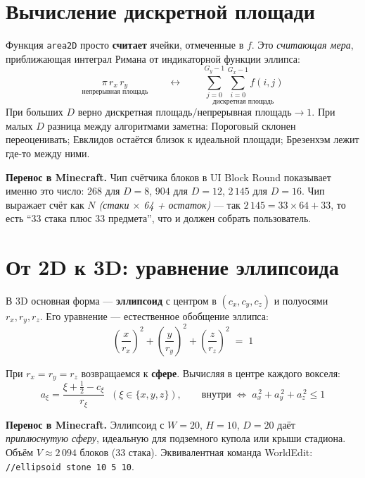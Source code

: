 \documentclass[12pt,a4paper]{scrartcl}
\newcommand{\code}[1]{\texttt{\small #1}}
\newcommand{\acc}[1]{\textcolor{accent}{\textbf{#1}}}
\newcommand{\cmd}[1]{\textcolor{earth}{\texttt{\small #1}}}
\begin{document}
\section{Вычисление дискретной площади}

Функция \code{area2D} просто \acc{считает} ячейки, отмеченные в $f$. Это \emph{считающая мера}, приближающая интеграл Римана от индикаторной функции эллипса:
\[
\underset{\text{непрерывная площадь}}{\pi \, r_x \, r_y}
\qquad\longleftrightarrow\qquad
\underset{\text{дискретная площадь}}{\sum_{j=0}^{G_y-1}\sum_{i=0}^{G_x-1} f(i,j)}
\]
При больших $D$ верно $\text{дискретная площадь} / \text{непрерывная площадь} \to 1$. При малых $D$ разница между алгоритмами заметна: Пороговый склонен переоценивать; Евклидов остаётся близок к идеальной площади; Брезенхэм лежит где-то между ними.

\begin{minec}
\textbf{Перенос в Minecraft.} Чип счётчика блоков в UI Block Round показывает именно это число: $268$ для $D=8$, $904$ для $D=12$, $2\,145$ для $D=16$. Чип выражает счёт как \emph{$N$ (стаки $\times$ 64 + остаток)} — так $2\,145 = 33 \times 64 + 33$, то есть \enquote{$33$ стака плюс $33$ предмета}, что и должен собрать пользователь.
\end{minec}

\section{От 2D к 3D: уравнение эллипсоида}

В 3D основная форма — \acc{эллипсоид} с центром в $(c_x, c_y, c_z)$ и полуосями $r_x, r_y, r_z$. Его уравнение — естественное обобщение эллипса:
\[
\left(\dfrac{x}{r_x}\right)^{\!2} + \left(\dfrac{y}{r_y}\right)^{\!2} + \left(\dfrac{z}{r_z}\right)^{\!2} \;=\; 1
\]

При $r_x = r_y = r_z$ возвращаемся к \acc{сфере}. Вычисляя в центре каждого вокселя:
\[
a_\xi = \frac{\xi + \tfrac{1}{2} - c_\xi}{r_\xi}\;\;(\xi \in \{x,y,z\}),
\qquad
\text{внутри}\;\Longleftrightarrow\;a_x^{\,2} + a_y^{\,2} + a_z^{\,2} \leq 1
\]

\begin{minec}
\textbf{Перенос в Minecraft.} Эллипсоид с $W=20$, $H=10$, $D=20$ даёт \emph{приплюснутую сферу}, идеальную для подземного купола или крыши стадиона. Объём $V \approx 2\,094$ блоков ($33$ стака). Эквивалентная команда WorldEdit: \cmd{//ellipsoid stone 10 5 10}.
\end{minec}
\end{document}
